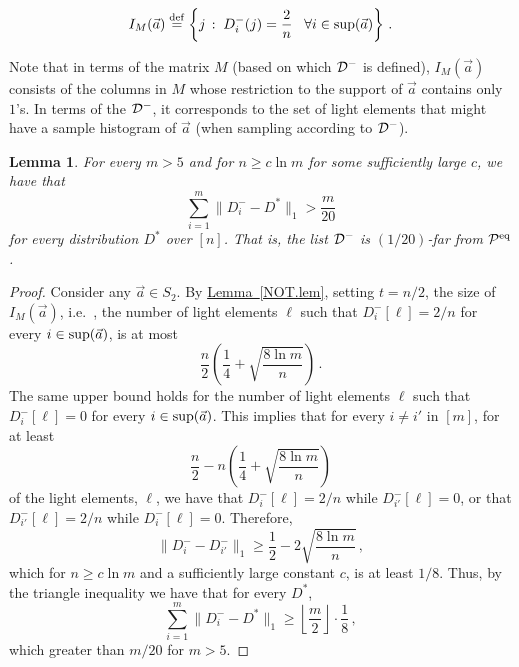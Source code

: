 \documentclass[10pt]{article}
\newtheorem{lemma}[theorem]{Lemma}
\theoremstyle{definition}
\providecommand{\ie}{i.e.\ }
\numberwithin{equation}{section}
\newcommand{\expref}[2]{\texorpdfstring{\hyperref[#2]{#1~\ref{#2}}}{#1~\ref{#2}}}
\newcommand{\calD}{{\cal D}}
\newcommand{\eqdef}{\stackrel{\rm def}{=}}
\newcommand{\calPid}{{\cal P}^{\rm eq}}
\newcommand{\BEQ}{\begin{equation}} \newcommand{\EEQ}{\end{equation}}
\newcommand{\BPF}{\begin{proof}} \newcommand {\EPF}{\end{proof}}
\begin{document}
\BEQ
I_M(\vec{a}) \eqdef \left\{j\,:\; D^-_i(j) = \frac{2}{n}
   \;\;\;\forall i \in {\rm sup}(\vec{a})\right\}\,.
\label{I-veca-def.eq}
\EEQ




Note that in terms of the matrix $M$ (based on which $\calD^-$ is defined),
$I_M(\vec{a})$ consists of the columns in $M$ whose restriction to the support
of $\vec{a}$ contains only $1$'s. In terms of the $\calD^-$, it corresponds to the set of light elements that might have a sample histogram of $\vec{a}$ (when sampling according to $\calD^-$).

%







%

%

\begin{lemma} \label{far.lem}
For every $m > 5$ and for
%
$n\geq c\ln m$ for some sufficiently large $c$,
we have that 
\[
\sum_{i=1}^m \|D^-_i - D^*\|_1 > \frac{m}{20}
\]
for every
distribution $D^*$ over $[n]$.
That is, the list $\calD^-$ is $(1/20)$-far from $\calPid$.
\end{lemma}

%

%
\def\FarLemPrf{
Consider any $\vec{a}\in S_2$. By \expref{Lemma}{NOT.lem}, setting $t=n/2$,
the size of $I_M(\vec{a})$, \ie, the number of light elements $\ell$
such that $D^-_i[\ell] = {2}/{n}$ for every $i\in {\rm sup}(\vec{a})$, is at most
%
\[
\frac{n}{2}\left(\frac{1}{4} + \sqrt{\frac{8 \ln m}{n}}\right)\,.
\]
The same upper bound
holds for the number of light elements $\ell$
such that $D^-_{i}[\ell] = 0$ for every $i\in {\rm sup}(\vec{a})$.
This implies that for every $i\neq i'$ in $[m]$,
for at least
%
\[
\frac{n}{2} - n\left(\frac{1}{4} + \sqrt{\frac{8 \ln m}{n}}\right)
\]
of the light elements, $\ell$,
we have that $D^-_i[\ell] = {2}/{n}$ while $D^-_{i'}[\ell] = 0$,
or that $D^-_{i'}[\ell] = {2}/{n}$ while $D^-_{i}[\ell] = 0$.
Therefore,
%
%
%
\[
\|D^-_i - D^-_{i'}\|_1 \geq \frac{1}{2} -2\sqrt{\frac{8\ln m}{n}}\,,
\]
 which for $n \geq c\ln m$ and a sufficiently large constant $c$,
is at least ${1}/{8}$. Thus, by the triangle inequality we have that
for every $D^*$,
\[
\sum_{i=1}^m \|D^-_i - D^*\|_1 \geq \left\lfloor{\frac{m}{2}}\right\rfloor\cdot
\frac{1}{8}\,,
\] which greater than $m/20$ for $m>5$.
}
%

\BPF
\FarLemPrf
\EPF
\medskip

%
\end{document}
